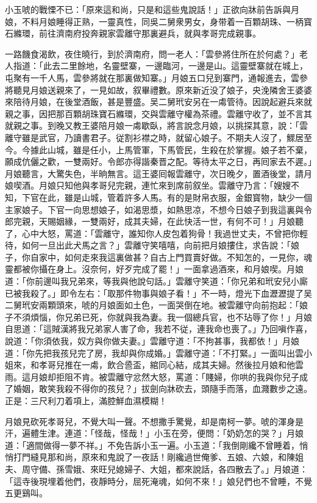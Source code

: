 小玉唬的戰慄不已：「原來這和尚，只是和這些鬼說話！」正欲向牀前告訴與月娘，不料月娘睡得正熟，一靈真性，同吳二舅衆男女，身带着一百顆胡珠、一柄寳石縧環，前往濟南府投奔親家雲離守那裏避兵，就與孝哥完成親事。

一路饑食渴飲，夜住曉行，到於濟南府，問一老人：「雲參將住所在於何處？」老人指道：「此去二里餘地，名靈壁寨，一邊臨河，一邊是山。這靈壁寨就在城上，屯聚有一千人馬，雲參將就在那裏做知寨。」月娘五口兒到寨門，通報進去，雲參將聽見月娘送親來了，一見如故，叙畢禮數。原來新近没了娘子，央浼隣舍王婆婆來陪待月娘，在後堂酒飯，甚是豐盛。吴二舅玳安另在一䖏管待。因說起避兵來就親之事，因把那百顆胡珠寶石縧環，交與雲離守權為茶禮。雲離守收了，並不言其就親之事。到晚又教王婆陪月娘一䖏歇臥，將言說念月娘，以挑探其意，說：「雲離守雖是武官，乃讀書君子。従割衫襟之時，就留心娘子。不期夫人沒了，鰥居至今。今據此山城，雖是任小，上馬管軍，下馬管民，生殺在於掌握。娘子若不棄，願成伉儷之歡，一雙兩好。令郎亦得諧秦晋之配。等待太平之日，再囘家去不遲。」月娘聽言，大驚失色，半晌無言。這王婆囘報雲離守，次日晚夕，置酒後堂，請月娘喫酒。月娘只知他與孝哥兒完親，連忙來到席前叙坐。雲離守乃言：「嫂嫂不知，下官在此，雖是山城，管着許多人馬。有的是財帛衣服，金銀寳物，缺少一個主家娘子。下官一向思想娘子，如渴思漿，如熱思凉，不想今日娘子到我這裏與令郎完親，天賜姻緣，一雙兩好，成其夫婦，在此快活一世，有何不可！」月娘聽了，心中大怒，罵道：「雲離守，誰知你人皮包着狗骨！我過世丈夫，不曾把你輕待，如何一旦出此犬馬之言？」雲離守笑嘻嘻，向前把月娘摟住，求告說：「娘子，你自家中，如何走來我這裏做甚？自古上門買賣好做。不知怎的，一見你，魂靈都被你攝在身上。沒奈何，好歹完成了罷！」一面拿過酒來，和月娘喫。月娘道：「你前邊叫我兄弟來，等我與他說句話。」雲離守笑道：「你兄弟和玳安兒小廝已被我殺了。」即令左右：「取那件物事與娘子看！」不一時，燈光下血瀝瀝提了吴二舅玳安兩顆頭來，唬的月娘面如土色，一面哭倒在地。被雲離守向前抱起：「娘子不須煩惱，你兄弟已死，你就與我為妻。我一個總兵官，也不玷辱了你！」月娘自思道：「這賊漢將我兄弟家人害了命，我若不従，連我命也喪了。」乃回嗔作喜，說道：「你須依我，奴方與你做夫妻。」雲離守道：「不拘甚事，我都依！」月娘道：「你先把我孩兒完了房，我却與你成婚。」雲離守道：「不打緊。」一面叫出雲小姐來，和孝哥兒推在一䖏，飲合巹盃，綰同心結，成其夫婦。然後拉月娘和他雲雨。這月娘却拒阻不肯。被雲離守忿然大怒，罵道：「賤婦，你哄的我與你兒子成了婚姻，敢笑我殺不得你的孩兒？」拔劍向牀砍去，頭隨手而落，血濺數步之遠。正是：三尺利刀着項上，滿腔鮮血濕模糊！

月娘見砍死孝哥兒，不覺大叫一聲。不想撒手驚覺，却是南柯一夢。唬的渾身是汗，遍體生津。連道：「怪哉，怪哉！」小玉在旁，便問：「奶奶怎的哭？」月娘道：「適間做得一夢不祥。」不免告訴小玉一遍。小玉道：「我倒剛纔不曾睡着，悄悄打門縫見那和尚，原來和鬼說了一夜話！剛纔過世俺爹、五娘、六娘，和陳姐夫、周守備、孫雪娥、來旺兒媳婦子、大姐，都來說話，各四散去了。」月娘道：「這寺後現埋着他們，夜靜時分，屈死淹魂，如何不來！」娘兒們也不曾睡，不覺五更鷄叫。

